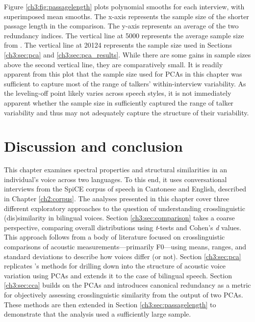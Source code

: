 Figure \ref{ch3:fig:passagelength} plots polynomial smooths for each interview, with superimposed mean smooths. The x-axis represents the sample size of the shorter passage length in the comparison. The y-axis represents an average of the two redundancy indices. The vertical line at 5000 represents the average sample size from \citet{lee_2019_acoustic}. The vertical line at 20124 represents the sample size used in Sections \ref{ch3:sec:pca} and \ref{ch3:sec:pca_results}. While there are some gains in sample sizes above the second vertical line, they are comparatively small. It is readily apparent from this plot that the sample size used for PCAs in this chapter was sufficient to capture most of the range of talkers' within-interview variability. As the leveling-off point likely varies across speech styles, it is not immediately apparent whether the sample size in \citet{lee_2019_acoustic} sufficiently captured the range of talker variability and thus may not adequately capture the structure of their variability. 

\section{Discussion and conclusion}\label{ch3:sec:discussion}

This chapter examines spectral properties and structural similarities in an individual's voice across two languages. To this end, it uses conversational interviews from the SpiCE corpus of speech in Cantonese and English, described in Chapter \ref{ch2:corpus}. The analyses presented in this chapter cover three different exploratory approaches to the question of understanding crosslinguistic (dis)similarity in bilingual voices. Section \ref{ch3:sec:comparison} takes a coarse perspective, comparing overall distributions using \textit{t}-tests and Cohen's \textit{d} values. This approach follows from a body of literature focused on crosslinguistic comparisons of acoustic measurements---primarily F0---using means, ranges, and standard deviations to describe how voices differ (or not). Section \ref{ch3:sec:pca} replicates \citeauthor{lee_2019_acoustic}'s \citeyearpar{lee_2019_acoustic} methods for drilling down into the structure of acoustic voice variation using PCAs and extends it to the case of bilingual speech. Section \ref{ch3:sec:cca} builds on the PCAs and introduces canonical redundancy as a metric for objectively assessing crosslinguistic similarity from the output of two PCAs. These methods are then extended in Section \ref{ch3:sec:passagelength} to demonstrate that the analysis used a sufficiently large sample.

